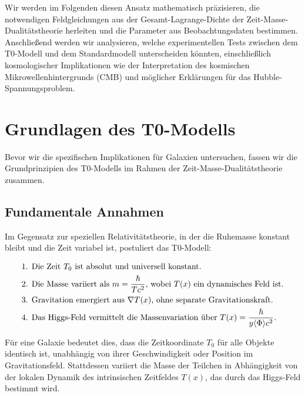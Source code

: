 \documentclass[a4paper,12pt]{article}
\newcommand{\Tfield}{T(x)}
\begin{document}
	Wir werden im Folgenden diesen Ansatz mathematisch präzisieren, die notwendigen Feldgleichungen aus der Gesamt-Lagrange-Dichte der Zeit-Masse-Dualitätstheorie herleiten und die Parameter aus Beobachtungsdaten bestimmen. Anschließend werden wir analysieren, welche experimentellen Tests zwischen dem T0-Modell und dem Standardmodell unterscheiden könnten, einschließlich kosmologischer Implikationen wie der Interpretation des kosmischen Mikrowellenhintergrunds (CMB) und möglicher Erklärungen für das Hubble-Spannungsproblem.
	
	\section{Grundlagen des T0-Modells}
	
	Bevor wir die spezifischen Implikationen für Galaxien untersuchen, fassen wir die Grundprinzipien des T0-Modells im Rahmen der Zeit-Masse-Dualitätstheorie zusammen.
	
	\subsection{Fundamentale Annahmen}
	
	Im Gegensatz zur speziellen Relativitätstheorie, in der die Ruhemasse konstant bleibt und die Zeit variabel ist, postuliert das T0-Modell:
	
	\begin{tcolorbox}[colback=blue!5!white,colframe=blue!75!black,title=Grundannahmen des T0-Modells]
		\begin{align}
			&\text{1. Die Zeit \( T_0 \) ist absolut und universell konstant.} \\
			&\text{2. Die Masse variiert als \( m = \frac{\hbar}{T c^2} \), wobei \( \Tfield \) ein dynamisches Feld ist.} \\
			&\text{3. Gravitation emergiert aus \( \nabla \Tfield \), ohne separate Gravitationskraft.} \\
			&\text{4. Das Higgs-Feld vermittelt die Massenvariation über \( \Tfield = \frac{\hbar}{y \langle \Phi \rangle c^2} \).}
		\end{align}
	\end{tcolorbox}
	
	Für eine Galaxie bedeutet dies, dass die Zeitkoordinate \( T_0 \) für alle Objekte identisch ist, unabhängig von ihrer Geschwindigkeit oder Position im Gravitationsfeld. Stattdessen variiert die Masse der Teilchen in Abhängigkeit von der lokalen Dynamik des intrinsischen Zeitfeldes \( \Tfield \), das durch das Higgs-Feld bestimmt wird.
	
\end{document}
